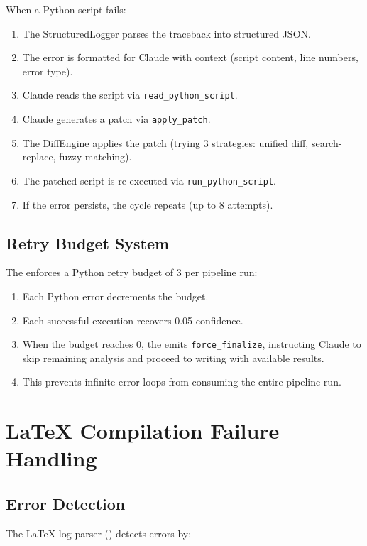 When a Python script fails:

\begin{enumerate}
  \item The StructuredLogger parses the traceback into structured JSON.
  \item The error is formatted for Claude with context (script content, line numbers, error type).
  \item Claude reads the script via \texttt{read\_python\_script}.
  \item Claude generates a patch via \texttt{apply\_patch}.
  \item The DiffEngine applies the patch (trying 3 strategies: unified diff, search-replace, fuzzy matching).
  \item The patched script is re-executed via \texttt{run\_python\_script}.
  \item If the error persists, the cycle repeats (up to 8 attempts).
\end{enumerate}

\subsection{Retry Budget System}

The \governor enforces a Python retry budget of 3 per pipeline run:

\begin{enumerate}
  \item Each Python error decrements the budget.
  \item Each successful execution recovers 0.05 confidence.
  \item When the budget reaches 0, the \governor emits \texttt{force\_finalize}, instructing Claude to skip remaining analysis and proceed to writing with available results.
  \item This prevents infinite error loops from consuming the entire pipeline run.
\end{enumerate}

\section{LaTeX Compilation Failure Handling}
\label{sec:failure:latex}

\subsection{Error Detection}

The \LaTeX{} log parser () detects errors by:

